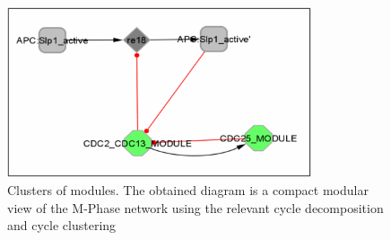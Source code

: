 \begin{figure}
\centering
\includegraphics[width=0.8\textwidth]{graphics/Clusters_of_modules_using_the_cycle_decomposition}
\caption{Clusters of modules. The obtained diagram is a compact modular view of the M-Phase network using the relevant cycle decomposition and cycle clustering}
\label{Clusters_of_modules_using_the_cycle_decomposition}
\end{figure}

